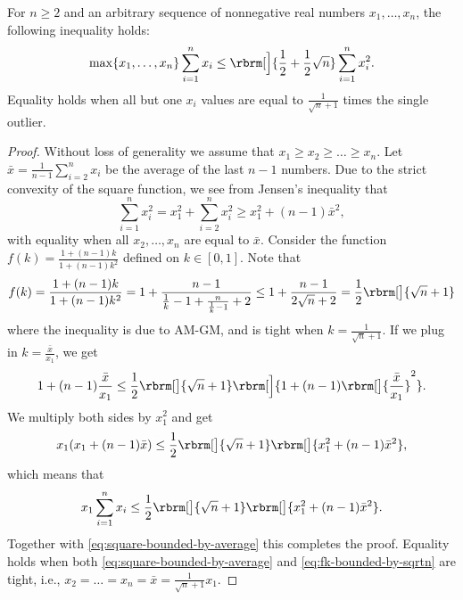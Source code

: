 \begin{lemma}
    \label{lem:sqrtk-ratio}
    For $n\geq 2$ and an arbitrary sequence of nonnegative real numbers $x_1,\dots,x_n$, the following inequality holds:
    \begin{equation*}
        \max\cbr{x_1,\dots,x_n}\sum_{i=1}^n x_i \leq \rbrm[\Big]{\frac{1}{2}+\frac{1}{2}\sqrt{n}} \sum_{i=1}^n x_i^2.
    \end{equation*}
    Equality holds when all but one $x_i$ values are equal to $\frac{1}{\sqrt{n}+1}$ times the single outlier.
\end{lemma}
\begin{proof}
    Without loss of generality we assume that $x_1\geq x_2\geq \dots \geq x_n$. Let $\bar{x}=\frac{1}{n-1} \sum_{i=2}^n x_i$ be the average of the last $n-1$ numbers. Due to the strict convexity of the square function, we see from Jensen's inequality that
    \begin{equation}
        \sum_{i=1}^n x_i^2 = x_1^2 + \sum_{i=2}^n x_i^2 \geq x_1^2 + (n-1) \bar{x}^2,\label{eq:square-bounded-by-average}
    \end{equation}
    with equality when all $x_2, \dots, x_n$ are equal to $\bar{x}$. Consider the function $f(k)=\frac{1+(n-1)k}{1+(n-1)k^2}$ defined on $k\in [0, 1]$. Note that
    \begin{equation}
        f(k)
        =    \frac{1+(n-1)k}{1+(n-1)k^2}
        =    1+\frac{n-1}{\frac{1}{k}-1+\frac{n}{\frac{1}{k}-1}+2}
        \leq 1+\frac{n-1}{2\sqrt{n}+2}
        =    \frac12 \rbrm[\big]{\sqrt{n}+1}\label{eq:fk-bounded-by-sqrtn} 
    \end{equation}
    where the inequality is due to AM-GM, and is tight when $k=\frac{1}{\sqrt{n}+1}$.
    If we plug in $k=\frac{\bar{x}}{x_1}$, we get
    \begin{align*}
        1+(n-1)\frac{\bar{x}}{x_1}
        &\leq
        \frac12 \rbrm[\big]{\sqrt{n}+1} \rbrm[\Big]{1+(n-1)\rbrm[\big]{\frac{\bar{x}}{x_1}}^2}.\\
    \end{align*}
    We multiply both sides by $x_1^2$ and get
    \begin{align*}
        x_1(x_1+(n-1)\bar{x})
        &\leq
        \frac12 \rbrm[\big]{\sqrt{n}+1} \rbrm[\big]{x_1^2+(n-1)\bar{x}^2},\\
    \end{align*}
    which means that
    \begin{align*}
        x_1\sum_{i=1}^n x_i
        &\leq
        \frac12 \rbrm[\big]{\sqrt{n}+1} \rbrm[\big]{x_1^2+(n-1)\bar{x}^2}.\\
    \end{align*}
    Together with \eqref{eq:square-bounded-by-average} this completes the proof.
    Equality holds when both \eqref{eq:square-bounded-by-average} and \eqref{eq:fk-bounded-by-sqrtn} are tight, i.e., $x_2=\dots=x_n=\bar{x}=\frac{1}{\sqrt{n}+1}x_1$.
\end{proof}
